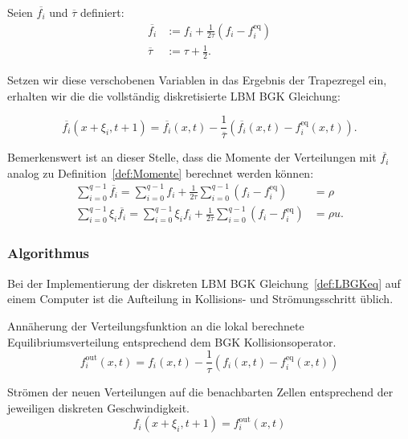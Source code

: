 \begin{Definition}
\label{def:LBGKeq}
Seien \(\overline{f_i}\) und \(\overline\tau\) definiert:
\begin{align*}
\overline{f_i} &:= f_i + \frac{1}{2\tau}(f_i - f_i^\text{eq}) \\
\overline\tau &:= \tau + \frac{1}{2}.
\end{align*}

Setzen wir diese verschobenen Variablen in das Ergebnis der Trapezregel ein, erhalten \cite[Kap.~A.5 mit \(\Delta t=1\)]{Krueger17} wir die die vollständig diskretisierte LBM BGK Gleichung:

\[\overline{f_i}(x+\xi_i,t+1) = \overline{f_i}(x,t) - \frac{1}{\overline\tau} (\overline{f_i}(x,t) - f_i^\text{eq}(x,t)).\]
\end{Definition}

Bemerkenswert ist an dieser Stelle, dass die Momente der Verteilungen mit \(\overline{f_i}\) analog zu Definition~\ref{def:Momente} berechnet werden können:
\begin{align*}
\sum_{i=0}^{q-1} \overline{f_i} = \sum_{i=0}^{q-1} f_i + \frac{1}{2\tau} \sum_{i=0}^{q-1} (f_i - f_i^\text{eq}) &= \rho \\
\sum_{i=0}^{q-1} \xi_i \overline{f_i} = \sum_{i=0}^{q-1} \xi_i f_i + \frac{1}{2\tau} \sum_{i=0}^{q-1} (f_i - f_i^\text{eq}) &= \rho u.
\end{align*}

\newpage
\subsubsection{Algorithmus}\label{kap:LBMimpl}

Bei der Implementierung der {diskreten LBM BGK Gleichung}~\ref{def:LBGKeq} auf einem Computer ist die Aufteilung in Kollisions- und Strömungsschritt üblich.

\begin{Definition}[Kollisionsschritt]
Annäherung der Verteilungsfunktion an die lokal berechnete Equilibriumsverteilung entsprechend dem BGK Kollisionsoperator.
\[f_i^\text{out}(x,t) = f_i(x,t) - \frac{1}{\tau}(f_i(x,t) - f_i^\text{eq}(x,t))\]
\end{Definition}

\begin{Definition}[Strömungsschritt]
Strömen der neuen Verteilungen auf die benachbarten Zellen entsprechend der jeweiligen diskreten Geschwindigkeit.
\[f_i(x+\xi_i,t+1) = f_i^\text{out}(x,t)\]
\end{Definition}

